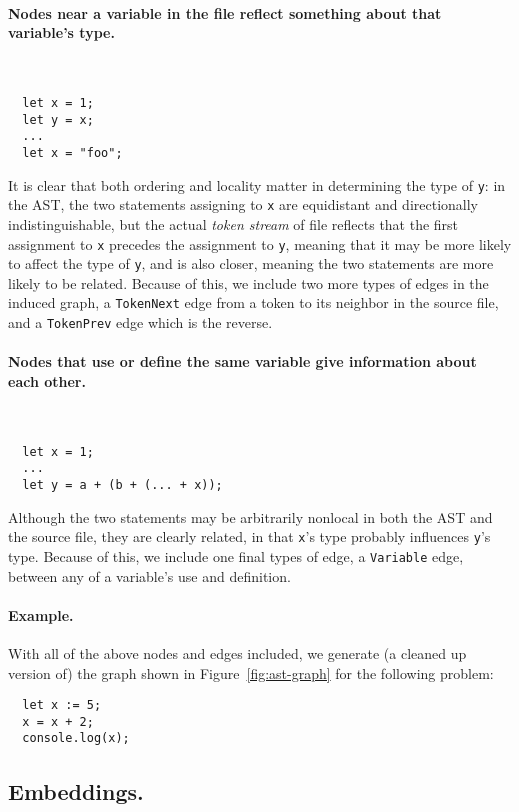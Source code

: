 \par\paragraph{Nodes near a variable in the file reflect something about that variable's type.}
\ %
\begin{lstlisting}
  let x = 1;
  let y = x;
  ...
  let x = "foo";
\end{lstlisting}
It is clear that both ordering and locality matter in determining the type of \texttt{y}: in the AST, the two statements assigning to \texttt{x} are equidistant and directionally indistinguishable, but the actual \emph{token stream} of file reflects that the first assignment to \texttt{x} precedes the assignment to \texttt{y}, meaning that it may be more likely to affect the type of \texttt{y}, and is also closer, meaning the two statements are more likely to be related.
Because of this, we include two more types of edges in the induced graph, a \texttt{TokenNext} edge from a token to its neighbor in the source file, and a \texttt{TokenPrev} edge which is the reverse.

\paragraph{Nodes that use or define the same variable give information about each other.}
\ %
\begin{lstlisting}
  let x = 1;
  ...
  let y = a + (b + (... + x));
\end{lstlisting}
Although the two statements may be arbitrarily nonlocal in both the AST and the source file, they are clearly related, in that \texttt{x}'s type probably influences \texttt{y}'s type.
Because of this, we include one final types of edge, a \texttt{Variable} edge, between any of a variable's use and definition.

\paragraph{Example.}
With all of the above nodes and edges included, we generate (a cleaned up version of) the graph shown in Figure~\ref{fig:ast-graph} for the following problem:
\begin{lstlisting}
  let x := 5;
  x = x + 2;
  console.log(x);
\end{lstlisting}

\subsection{Embeddings.}

